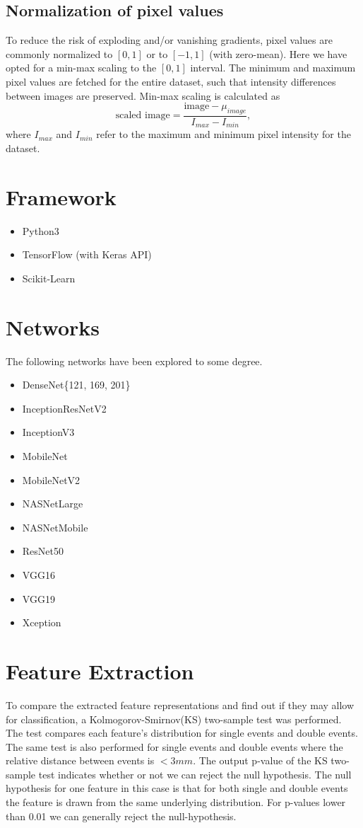 \documentclass[12pt, notitlepage]{article}
\newcommand{\f}[2]{\frac{#1}{#2}}
\begin{document}
\subsection{Normalization of pixel values}
To reduce the risk of exploding and/or vanishing gradients, pixel values are commonly
normalized to $[0, 1]$ or to $[-1, 1]$ (with zero-mean). Here we have opted for a min-max scaling to the $[0, 1]$ interval.
The minimum and maximum pixel values are fetched for the entire dataset, such that intensity differences
between images are preserved. Min-max scaling is calculated as
\begin{equation}
    \text{scaled image} = \f{\text{image} - \mu_{image}}{I_{max} - I_{min}},
\end{equation}
where $I_{max}$ and $I_{min}$ refer to the maximum and minimum pixel intensity for the dataset.


\section{Framework}
\begin{itemize}
    \item Python3
    \item TensorFlow (with Keras API)
    \item Scikit-Learn
\end{itemize}
\section{Networks}
The following networks have been explored to some degree.
\begin{itemize}
    \item DenseNet\{121, 169, 201\}
    \item InceptionResNetV2
    \item InceptionV3
    \item MobileNet
    \item MobileNetV2
    \item NASNetLarge
    \item NASNetMobile
    \item ResNet50
    \item VGG16
    \item VGG19
    \item Xception
\end{itemize}
\section{Feature Extraction}
To compare the extracted feature representations and find out if they may allow for classification,
a Kolmogorov-Smirnov(KS) two-sample test was performed. The test compares each feature's distribution
for single events and double events. The same test is also performed for single events and double events 
where the relative distance between events is $< 3mm$. The output p-value of the KS two-sample test
indicates whether or not we can reject the null hypothesis. The null hypothesis for one feature in this 
case is that for both single and double events the feature is drawn from the same underlying distribution.
For p-values lower than 0.01 we can generally reject the null-hypothesis. 
\end{document}
